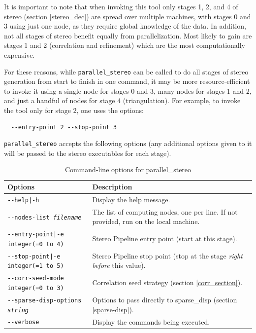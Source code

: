 It is important to note that when invoking this tool only stages 1, 2,
and 4 of stereo (section \ref{stereo_dec}) are spread over multiple
machines, with stages 0 and 3 using just one node, as they require
global knowledge of the data. In addition, not all stages of stereo
benefit equally from parallelization. Most likely to gain are stages 1
and 2 (correlation and refinement) which are the most computationally
expensive.

For these reasons, while \texttt{parallel\_stereo} can be called to do
all stages of stereo generation from start to finish in one command, it
may be more resource-efficient to invoke it using a single node for
stages 0 and 3, many nodes for stages 1 and 2, and just a handful of
nodes for stage 4 (triangulation). For example, to invoke the tool
only for stage 2, one uses the options:

\begin{verbatim}
  --entry-point 2 --stop-point 3
\end{verbatim}

\texttt{parallel\_stereo} accepts the following options (any additional
options given to it will be passed to the stereo executables
for each stage).

\begin{longtable}{|l|p{7.5cm}|}
\caption{Command-line options for parallel\_stereo}
\label{tbl:parallelstereo}
\endfirsthead
\endhead
\endfoot
\endlastfoot
\hline
Options & Description \\ \hline \hline
\texttt{-\/-help|-h} & Display the help message.\\ \hline
\texttt{-\/-nodes-list \textit{filename} } & The list of computing nodes,
one per line. If not provided, run on the local machine. \\ \hline
\texttt{-\/-entry-point|-e integer(=0 to 4)} & Stereo Pipeline entry
point (start at this stage). \\ \hline
\texttt{-\/-stop-point|-e integer(=1 to 5)} & Stereo Pipeline stop point
(stop at the stage {\it right before} this value). \\ \hline
\texttt{-\/-corr-seed-mode integer(=0 to 3)} & Correlation seed strategy
(section \ref{corr_section}). \\ \hline
\texttt{-\/-sparse-disp-options \textit{string} } & Options to pass directly
to sparse\_disp (section \ref{sparse-disp}). \\ \hline
\texttt{-\/-verbose } & Display the commands being executed. \\ \hline
\end{longtable}

